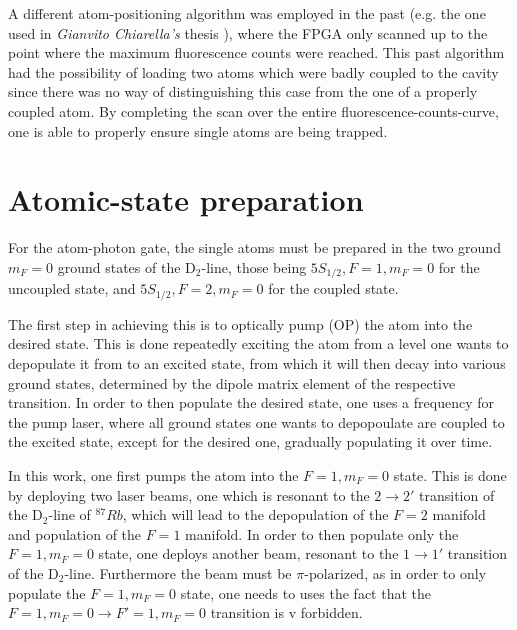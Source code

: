 A different atom-positioning algorithm was employed in the past (e.g. the one used in \textit{Gianvito Chiarella's} thesis \cite{GianvitoC2026}), where the FPGA only scanned up to the point where the maximum fluorescence counts were reached. This past algorithm had the possibility of loading two atoms which were badly coupled to the cavity since there was no way of distinguishing this case from the one of a properly coupled atom. By completing the scan over the entire fluorescence-counts-curve, one is able to properly ensure single atoms are being trapped.

\section{Atomic-state preparation}

For the atom-photon gate, the single atoms must be prepared in the two ground $m_F=0$ ground states of the $\text{D}_2\text{-line}$, those being $5 S_{1/2}, F=1, m_F = 0$ for the uncoupled state, and $5 S_{1/2}, F=2, m_F = 0$ for the coupled state.

The first step in achieving this is to optically pump (OP) the atom into the desired state. This is done repeatedly exciting the atom from a level one wants to depopulate it from to an excited state, from which it will then decay into various ground states, determined by the dipole matrix element of the respective transition. In order to then populate the desired state, one uses a frequency for the pump laser, where all ground states one wants to depopoulate are coupled to the excited state, except for the desired one, gradually populating it over time.

In this work, one first pumps the atom into the $F=1, m_F = 0$ state. This is done by deploying two laser beams, one which is resonant to the $2\rightarrow2'$ transition of the $\text{D}_2\text{-line}$ of $^{87}Rb$, which will lead to the depopulation of the $F=2$ manifold and population of the $F=1$ manifold. In order to then populate only the $F=1, m_F=0$ state, one deploys another beam, resonant to the $1\rightarrow1'$ transition of the $\text{D}_2\text{-line}$. Furthermore the beam must be $\pi\text{-polarized}$, as in order to only populate the $F=1,m_F=0$ state, one needs to uses the fact that the $F=1,m_F=0 \rightarrow F'=1,m_F=0$ transition is v forbidden.\cite{SteckRb87}

